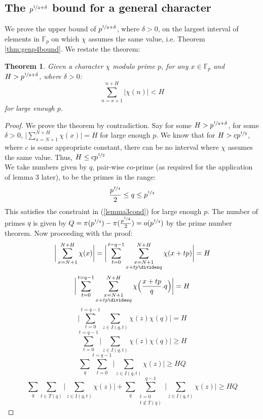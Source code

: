 \documentclass{report}
\newtheorem*{theorem*}{Theorem}
\begin{document}
\subsection{The $p^{\nicefrac{1}{4}+\delta}$ bound for a general character}
We prove the upper bound of $p^{\nicefrac{1}{4}+\delta}$, where $\delta>0$, on the largest interval of elements in $\mathbb{F}_p$ on which $\chi$ assumes the same value, i.e. Theorem \ref{thm:genp4bound}. We restate the theorem:
\begin{theorem*}
Given a character $\chi$ modulo prime $p$, for any $x\in\mathbb{F}_p$ and $H>p^{\nicefrac{1}{4}+\delta}$, where $\delta>0$:
\[\sum\limits_{n=x+1}^{n+H}\lvert\chi(n)\rvert<H\]
for large enough $p$.
\end{theorem*}
\begin{proof}
We prove the theorem by contradiction. Say for some $H>p^{\nicefrac{1}{4}+\delta}$, for some $\delta>0$, $\Big \lvert \sum\limits_{x=N+1}^{N+H}\chi(x)\Big \rvert=H$ for large enough $p$. We know that for $H>cp^{\nicefrac{1}{2}}$, where $c$ is some appropriate constant, there can be no interval where $\chi$ assumes the same value. Thus, $H\leq cp^{\nicefrac{1}{2}}$\\
We take numbers given by $q$, pair-wise co-prime (as required for the application of lemma 3 later), to be the primes in the range:
$$\frac{p^{\nicefrac{1}{4}}}{2} \leq q \leq p^{\nicefrac{1}{4}}$$
This satisfies the constraint in (\ref{lemma3cond}) for large enough $p$. The number of primes $q$ is given by $Q=\pi(p^{\nicefrac{1}{4}})-\pi(\frac{p^{\nicefrac{1}{4}}}{2})=o(p^{\nicefrac{1}{4}})$ by the prime number theorem. Now proceeding with the proof:
\[\bigg \lvert\sum\limits_{x=N+1}^{N+H}\chi(x)\bigg \rvert=\bigg \lvert\sum\limits_{t=0}^{t=q-1}\sum\limits_{\substack{x=N+1\\x+tp\divides q}}^{N+H}\chi(x+tp)\bigg \rvert=H \]
$$\bigg \lvert\sum\limits_{t=0}^{t=q-1}\sum\limits_{\substack{x=N+1\\x+tp\divides q}}^{N+H} \chi \Big(\frac{x+tp}{q}.q\Big)\bigg \rvert=H$$
$$\bigg \lvert\sum\limits_{t=0}^{t=q-1}\sum\limits_{z\in I(q,t)}\chi(z)\chi(q)\bigg \rvert=H$$
$$\sum\limits_{t=0}^{t=q-1}\bigg \lvert\sum\limits_{z\in I(q,t)}\chi(z)\chi(q)\bigg \rvert \geq H$$
$$\sum_q\sum\limits_{t=0}^{t=q-1}\bigg \lvert\sum\limits_{z\in I(q,t)}\chi(z)\bigg \rvert \geq HQ$$
\begin{equation} \label{seperationgen}
\sum_q\sum\limits_{t\in T(q)}\bigg \lvert\sum\limits_{z\in I(q,t)}\chi(z)\bigg \rvert+\sum_q\sum\limits_{\substack{t=0\\t\not \in T(q)}}^{q-1}\bigg \lvert\sum\limits_{z\in I(q,t)}\chi(z)\bigg \rvert \geq HQ

\end{equation}
\end{proof}
\end{document}

